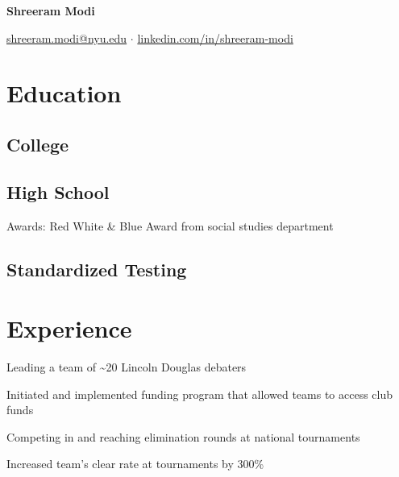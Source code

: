 \documentclass[letterpaper]{resume-shreeram}
\begin{document}
\begin{center}
  {\Huge \bfseries Shreeram Modi}

  \href{mailto:shreeram.modi@nyu.edu}{shreeram.modi@nyu.edu} $\cdot$
  \href{https://linkedin.com/in/shreeram-modi}{linkedin.com/in/shreeram-modi}
\end{center}

\section{Education}

\subsection{College}


\subsection{High School}

\begin{compactitem}
  \item Awards: Red White \& Blue Award from social studies department
\end{compactitem}

\subsection{Standardized Testing}


\section{Experience}

\begin{compactitem}
    \item Leading a team of \textasciitilde{}20 Lincoln Douglas debaters

    \item Initiated and implemented funding program that allowed teams
      to access club funds

    \item Competing in and reaching elimination rounds at national tournaments

    \item Increased team's clear rate at tournaments by 300\%
\end{compactitem}
\end{document}
